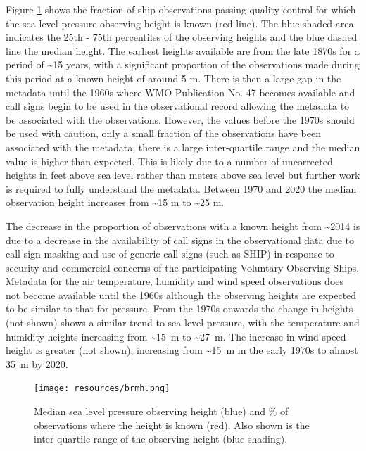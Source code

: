 Figure \ref{fig:slp_heights} shows the fraction of ship observations passing quality control for which the sea level pressure observing height is known (red line). The blue shaded area indicates the 25th - 75th percentiles of the observing heights and the blue dashed line the median height. 
The earliest heights available are from the late 1870s for a period of \sim 15 years, with a significant proportion of the observations made during this period at a known height of around 5 m. 
There is then a large gap in the metadata until the 1960s where WMO Publication No. 47 becomes available and call signs begin to be used in the observational record allowing the metadata to be associated with the observations. 
However, the values before the 1970s should be used with caution, only a small fraction of the observations have been associated with the metadata, there is a large inter-quartile range and the median value is higher than expected.
This is likely due to a number of uncorrected heights in feet above sea level rather than meters above sea level but further work is required to fully understand the metadata.
Between 1970 and 2020 the median observation height increases from \sim 15 m to \sim 25 m.

The decrease in the proportion of observations with a known height from \sim 2014 is due to a decrease in the availability of call signs in the observational data due to call sign masking and use of generic call signs (such as SHIP) in response to security and commercial concerns of the participating Voluntary Observing Ships.
Metadata for the air temperature, humidity and wind speed observations does not become available until the 1960s although the observing heights are expected to be similar to that for pressure. 
From the 1970s onwards the change in heights (not shown) shows a similar trend to sea level pressure, with the temperature and humidity heights increasing from \sim 15~m to \sim 27~m. 
The increase in wind speed height is greater (not shown), increasing from \sim 15~m in the early 1970s to almost 35~m by 2020.

\begin{figure}[h]
    \texttt{[image: resources/brmh.png]}
    \caption{Median sea level pressure observing height (blue) and \% of observations where the height is known (red). Also shown is the inter-quartile range of the observing height (blue shading).\\}
    \label{fig:slp_heights}
\end{figure}

\FloatBarrier
